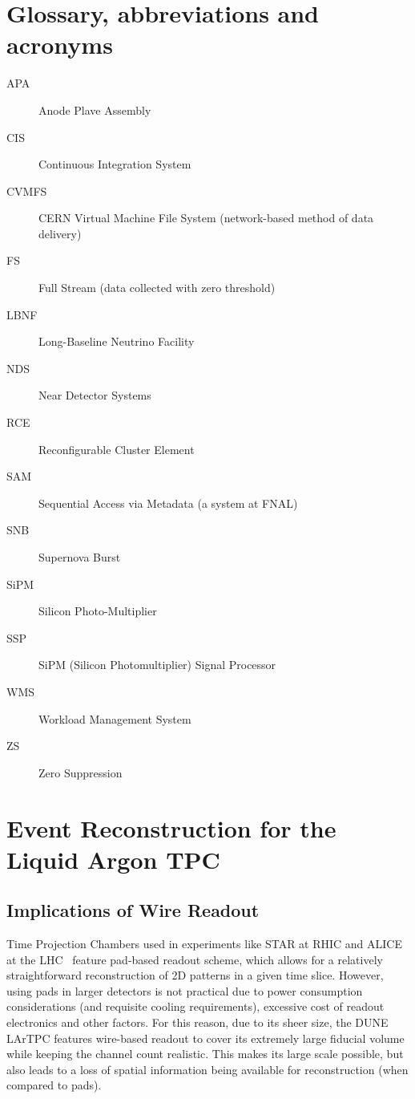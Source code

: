 \appendix
\section{Glossary, abbreviations and acronyms}

\begin{description}
\item[APA] Anode Plave Assembly
\item[CIS] Continuous Integration System
\item[CVMFS] CERN Virtual Machine File System (network-based method of data delivery)
\item[FS] Full Stream (data collected with zero threshold)
\item[LBNF] Long-Baseline Neutrino Facility
\item[NDS] Near Detector Systems
\item[RCE] Reconfigurable Cluster Element
\item[SAM] Sequential Access via Metadata (a system at FNAL)
\item[SNB] Supernova Burst
\item[SiPM] Silicon Photo-Multiplier
\item[SSP] SiPM (Silicon Photomultiplier) Signal Processor
\item[WMS] Workload Management System
\item[ZS] Zero Suppression
\end{description}

\section{Event Reconstruction for the Liquid Argon TPC}
\label{sec:reconstruction}
\subsection{Implications of Wire Readout}
Time Projection Chambers used in experiments like STAR at RHIC and ALICE at the LHC~\cite{alice}  feature
pad-based readout scheme, which allows for a relatively straightforward reconstruction of 2D patterns in
a given time slice. However, using pads in larger detectors is not practical due to power consumption considerations
(and requisite cooling requirements), excessive cost of readout electronics and other factors. For this reason, due
to its sheer size, the DUNE LArTPC features wire-based readout to cover its extremely large fiducial volume while
keeping the channel count realistic. This makes its large scale possible, but also leads to a loss of spatial information
being available for reconstruction (when compared to pads).


